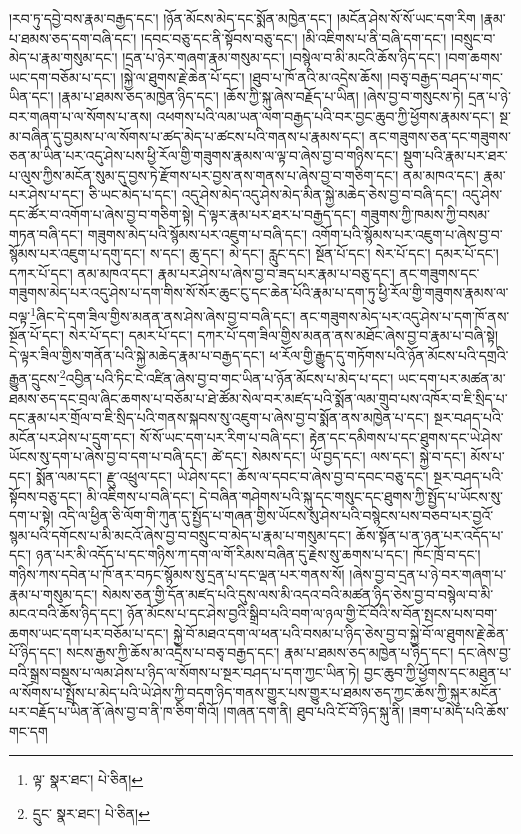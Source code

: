 །རབ་ཏུ་དབྱེ་བས་རྣམ་བརྒྱད་དང་། །ཉོན་མོངས་མེད་དང་སྨོན་མཁྱེན་དང་། །མངོན་ཤེས་སོ་སོ་ཡང་དག་རིག །རྣམ་པ་ཐམས་ཅད་དག་བཞི་དང་། །དབང་བཅུ་དང་ནི་སྟོབས་བཅུ་དང་། །མི་འཇིགས་པ་ནི་བཞི་དག་དང་། །བསྲུང་བ་མེད་པ་རྣམ་གསུམ་དང་། །དྲན་པ་ཉེར་གཞག་རྣམ་གསུམ་དང་། །བསྙེལ་བ་མི་མངའི་ཆོས་ཉིད་དང་། །བག་ཆགས་ཡང་དག་བཅོམ་པ་དང་། །སྐྱེ་ལ་ཐུགས་རྗེ་ཆེན་པོ་དང་། །ཐུབ་པ་ཁོ་ནའི་མ་འདྲེས་ཆོས། །བཅྭ་བརྒྱད་བཤད་པ་གང་ཡིན་དང་། །རྣམ་པ་ཐམས་ཅད་མཁྱེན་ཉིད་དང་། །ཆོས་ཀྱི་སྐུ་ཞེས་བརྗོད་པ་ཡིན། །ཞེས་བྱ་བ་གསུངས་ཏེ། དྲན་པ་ཉེ་བར་གཞག་པ་ལ་སོགས་པ་ནས། འཕགས་པའི་ལམ་ཡན་ལག་བརྒྱད་པའི་བར་བྱང་ཆུབ་ཀྱི་ཕྱོགས་རྣམས་དང་། སྔ་མ་བཞིན་དུ་བྱམས་པ་ལ་སོགས་པ་ཚད་མེད་པ་ཚངས་པའི་གནས་པ་རྣམས་དང་། ནང་གཟུགས་ཅན་དང་གཟུགས་ཅན་མ་ཡིན་པར་འདུ་ཤེས་པས་ཕྱི་རོལ་གྱི་གཟུགས་རྣམས་ལ་ལྟ་བ་ཞེས་བྱ་བ་གཉིས་དང་། སྡུག་པའི་རྣམ་པར་ཐར་པ་ལུས་ཀྱིས་མངོན་སུམ་དུ་བྱས་ཏེ་རྫོགས་པར་བྱས་ནས་གནས་པ་ཞེས་བྱ་བ་གཅིག་དང་། ནམ་མཁའ་དང་། རྣམ་པར་ཤེས་པ་དང་། ཅི་ཡང་མེད་པ་དང་། འདུ་ཤེས་མེད་འདུ་ཤེས་མེད་མིན་སྐྱེ་མཆེད་ཅེས་བྱ་བ་བཞི་དང་། འདུ་ཤེས་དང་ཚོར་བ་འགོག་པ་ཞེས་བྱ་བ་གཅིག་སྟེ། དེ་ལྟར་རྣམ་པར་ཐར་པ་བརྒྱད་དང་། གཟུགས་ཀྱི་ཁམས་ཀྱི་བསམ་གཏན་བཞི་དང་། གཟུགས་མེད་པའི་སྙོམས་པར་འཇུག་པ་བཞི་དང་། འགོག་པའི་སྙོམས་པར་འཇུག་པ་ཞེས་བྱ་བ་སྙོམས་པར་འཇུག་པ་དགུ་དང་། ས་དང་། ཆུ་དང་། མེ་དང་། རླུང་དང་། སྔོན་པོ་དང་། སེར་པོ་དང་། དམར་པོ་དང་། དཀར་པོ་དང་། ནམ་མཁའ་དང་། རྣམ་པར་ཤེས་པ་ཞེས་བྱ་བ་ཟད་པར་རྣམ་པ་བཅུ་དང་། ནང་གཟུགས་དང་གཟུགས་མེད་པར་འདུ་ཤེས་པ་དག་གིས་སོ་སོར་ཆུང་ངུ་དང་ཆེན་པོའི་རྣམ་པ་དག་ཏུ་ཕྱི་རོལ་གྱི་གཟུགས་རྣམས་ལ་བལྟ་\footnote{ལྟ་  སྣར་ཐང་།  པེ་ཅིན། }ཞིང་དེ་དག་ཟིལ་གྱིས་མནན་ནས་ཤེས་ཞེས་བྱ་བ་བཞི་དང་། ནང་གཟུགས་མེད་པར་འདུ་ཤེས་པ་དག་ཁོ་ནས་སྔོན་པོ་དང་། སེར་པོ་དང་། དམར་པོ་དང་། དཀར་པོ་དག་ཟིལ་གྱིས་མནན་ནས་མཐོང་ཞེས་བྱ་བ་རྣམ་པ་བཞི་སྟེ། དེ་ལྟར་ཟིལ་གྱིས་གནོན་པའི་སྐྱེ་མཆེད་རྣམ་པ་བརྒྱད་དང་། ཕ་རོལ་གྱི་རྒྱུད་དུ་གཏོགས་པའི་ཉོན་མོངས་པའི་དགྲའི་རྒྱུན་དྲུངས་\footnote{དྲུང་  སྣར་ཐང་།  པེ་ཅིན། }འབྱིན་པའི་ཏིང་ངེ་འཛིན་ཞེས་བྱ་བ་གང་ཡིན་པ་ཉོན་མོངས་པ་མེད་པ་དང་། ཡང་དག་པར་མཚན་མ་ཐམས་ཅད་དང་བྲལ་ཞིང་ཆགས་པ་བཅོམ་པ་ཐེ་ཚོམ་སེལ་བར་མཛད་པའི་སྨོན་ལམ་གྲུབ་པས་འཁོར་བ་ཇི་སྲིད་པ་དང་རྣམ་པར་གྲོལ་བ་ཇི་སྲིད་པའི་གནས་སྐབས་སུ་འཇུག་པ་ཞེས་བྱ་བ་སྨོན་ནས་མཁྱེན་པ་དང་། སྔར་བཤད་པའི་མངོན་པར་ཤེས་པ་དྲུག་དང་། སོ་སོ་ཡང་དག་པར་རིག་པ་བཞི་དང་། རྟེན་དང་དམིགས་པ་དང་ཐུགས་དང་ཡེ་ཤེས་ཡོངས་སུ་དག་པ་ཞེས་བྱ་བ་དག་པ་བཞི་དང་། ཚེ་དང་། སེམས་དང་། ཡོ་བྱད་དང་། ལས་དང་། སྐྱེ་བ་དང་། མོས་པ་དང་། སྨོན་ལམ་དང་། རྫུ་འཕྲུལ་དང་། ཡེ་ཤེས་དང་། ཆོས་ལ་དབང་བ་ཞེས་བྱ་བ་དབང་བཅུ་དང་། སྔར་བཤད་པའི་སྟོབས་བཅུ་དང་། མི་འཇིགས་པ་བཞི་དང་། དེ་བཞིན་གཤེགས་པའི་སྐུ་དང་གསུང་དང་ཐུགས་ཀྱི་སྤྱོད་པ་ཡོངས་སུ་དག་པ་སྟེ། འདི་ལ་ཕྱིན་ཅི་ལོག་གི་ཀུན་དུ་སྤྱོད་པ་གཞན་གྱིས་ཡོངས་སུ་ཤེས་པའི་བསྙེངས་པས་བཅབ་པར་བྱའོ་སྙམ་པའི་དགོངས་པ་མི་མངའོ་ཞེས་བྱ་བ་བསྲུང་བ་མེད་པ་རྣམ་པ་གསུམ་དང་། ཆོས་སྟོན་པ་ན་ཉན་པར་འདོད་པ་དང་། ཉན་པར་མི་འདོད་པ་དང་གཉིས་ཀ་དག་ལ་གོ་རིམས་བཞིན་དུ་རྗེས་སུ་ཆགས་པ་དང་། ཁོང་ཁྲོ་བ་དང་། གཉིས་ཀས་དབེན་པ་ཁོ་ནར་བཏང་སྙོམས་སུ་དྲན་པ་དང་ལྡན་པར་གནས་སོ། །ཞེས་བྱ་བ་དྲན་པ་ཉེ་བར་གཞག་པ་རྣམ་པ་གསུམ་དང་། སེམས་ཅན་གྱི་དོན་མཛད་པའི་དུས་ལས་མི་འདའ་བའི་མཚན་ཉིད་ཅེས་བྱ་བ་བསྙེལ་བ་མི་མངའ་བའི་ཆོས་ཉིད་དང་། ཉོན་མོངས་པ་དང་ཤེས་བྱའི་སྒྲིབ་པའི་བག་ལ་ཉལ་གྱི་ངོ་བོའི་ས་བོན་སྤངས་པས་བག་ཆགས་ཡང་དག་པར་བཅོམ་པ་དང་། སྐྱེ་བོ་མཐའ་དག་ལ་ཕན་པའི་བསམ་པ་ཉིད་ཅེས་བྱ་བ་སྐྱེ་བོ་ལ་ཐུགས་རྗེ་ཆེན་པོ་ཉིད་དང་། སངས་རྒྱས་ཀྱི་ཆོས་མ་འདྲེས་པ་བཅྭ་བརྒྱད་དང་། རྣམ་པ་ཐམས་ཅད་མཁྱེན་པ་ཉིད་དང་། དང་ཞེས་བྱ་བའི་སྒྲས་བསྡུས་པ་ལམ་ཤེས་པ་ཉིད་ལ་སོགས་པ་སྔར་བཤད་པ་དག་ཀྱང་ཡིན་ཏེ། བྱང་ཆུབ་ཀྱི་ཕྱོགས་དང་མཐུན་པ་ལ་སོགས་པ་སྤྲོས་པ་མེད་པའི་ཡེ་ཤེས་ཀྱི་བདག་ཉིད་གནས་གྱུར་པས་གྱུར་པ་ཐམས་ཅད་ཀྱང་ཆོས་ཀྱི་སྐུར་མངོན་པར་བརྗོད་པ་ཡིན་ནོ་ཞེས་བྱ་བ་ནི་ཁ་ཅིག་གིའོ། །གཞན་དག་ནི། ཐུབ་པའི་ངོ་བོ་ཉིད་སྐུ་ནི། །ཟག་པ་མེད་པའི་ཆོས་གང་དག 